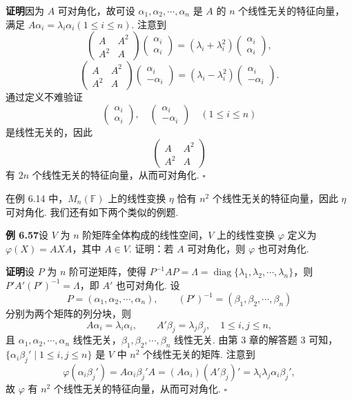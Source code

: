 \documentclass[UTF8,12pt,a4paper,fontset=fandol]{ctexart}
\begin{document}
\noindent\textbf{证明}\quad 因为 $A$ 可对角化，故可设 $\alpha_1,\alpha_2,\cdots,\alpha_n$ 是 $A$ 的 $n$ 个线性无关的特征向量，满足 $A\alpha_i=\lambda_i\alpha_i(1\le i\le n)$. 注意到
\[
\left(\begin{array}{cc}
A & A^2\\
A^2 & A
\end{array}\right)
\left(\begin{array}{c}
\alpha_i\\
\alpha_i
\end{array}\right)
=(\lambda_i+\lambda_i^2)
\left(\begin{array}{c}
\alpha_i\\
\alpha_i
\end{array}\right),
\]
\[
\left(\begin{array}{cc}
A & A^2\\
A^2 & A
\end{array}\right)
\left(\begin{array}{c}
\alpha_i\\
-\alpha_i
\end{array}\right)
=(\lambda_i-\lambda_i^2)
\left(\begin{array}{c}
\alpha_i\\
-\alpha_i
\end{array}\right).
\]
通过定义不难验证
\[
\left(\begin{array}{c}
\alpha_i\\
\alpha_i
\end{array}\right),\quad
\left(\begin{array}{c}
\alpha_i\\
-\alpha_i
\end{array}\right)
\quad (1\le i\le n)
\]
是线性无关的，因此
\[
\left(\begin{array}{cc}
A & A^2\\
A^2 & A
\end{array}\right)
\]
有 $2n$ 个线性无关的特征向量，从而可对角化. $\square$

在例 6.14 中，$M_n(\mathbb{F})$ 上的线性变换 $\eta$ 恰有 $n^2$ 个线性无关的特征向量，因此 $\eta$ 可对角化. 我们还有如下两个类似的例题.

\noindent\textbf{例 6.57}\quad 设 $V$ 为 $n$ 阶矩阵全体构成的线性空间，$V$ 上的线性变换 $\varphi$ 定义为 $\varphi(X)=AXA$，其中 $A\in V$. 证明：若 $A$ 可对角化，则 $\varphi$ 也可对角化.

\noindent\textbf{证明}\quad 设 $P$ 为 $n$ 阶可逆矩阵，使得 $P^{-1}AP=\Lambda=\operatorname{diag}\{\lambda_1,\lambda_2,\cdots,\lambda_n\}$，则 $P'A'(P')^{-1}=\Lambda$，即 $A'$ 也可对角化. 设
\[
P=(\alpha_1,\alpha_2,\cdots,\alpha_n),\qquad (P')^{-1}=(\beta_1,\beta_2,\cdots,\beta_n)
\]
分别为两个矩阵的列分块，则
\[
A\alpha_i=\lambda_i\alpha_i,\qquad A'\beta_j=\lambda_j\beta_j,\quad 1\le i,j\le n,
\]
且 $\alpha_1,\alpha_2,\cdots,\alpha_n$ 线性无关，$\beta_1,\beta_2,\cdots,\beta_n$ 线性无关. 由第 3 章的解答题 3 可知，$\{\alpha_i\beta_j'\mid 1\le i,j\le n\}$ 是 $V$ 中 $n^2$ 个线性无关的矩阵. 注意到
\[
\varphi(\alpha_i\beta_j')=A\alpha_i\beta_j'A=(A\alpha_i)(A'\beta_j)'=\lambda_i\lambda_j\alpha_i\beta_j',
\]
故 $\varphi$ 有 $n^2$ 个线性无关的特征向量，从而可对角化. $\square$
\end{document}
